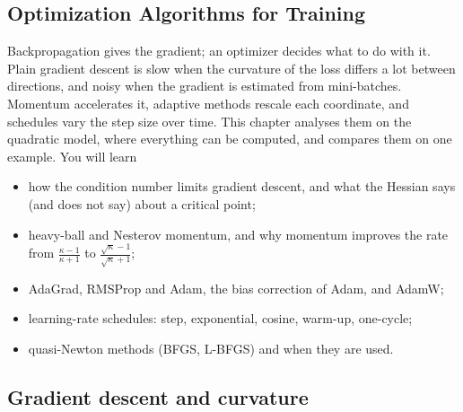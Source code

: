 \begin{notechapter}
\chapter{Optimization Algorithms for Training}\label{ch:optimizers}

\begin{chapterintro}
Backpropagation gives the gradient; an optimizer decides what to do with it. Plain gradient
descent is slow when the curvature of the loss differs a lot between directions, and noisy
when the gradient is estimated from mini-batches. Momentum accelerates it, adaptive methods
rescale each coordinate, and schedules vary the step size over time. This chapter analyses
them on the quadratic model, where everything can be computed, and compares them on one
example. You will learn
\begin{itemize}[nosep]
  \item how the condition number limits gradient descent, and what the Hessian says (and
        does not say) about a critical point;
  \item heavy-ball and Nesterov momentum, and why momentum improves the rate from
        $\frac{\kappa - 1}{\kappa + 1}$ to $\frac{\sqrt\kappa - 1}{\sqrt\kappa + 1}$;
  \item AdaGrad, RMSProp and Adam, the bias correction of Adam, and AdamW;
  \item learning-rate schedules: step, exponential, cosine, warm-up, one-cycle;
  \item quasi-Newton methods (BFGS, L-BFGS) and when they are used.
\end{itemize}
\end{chapterintro}

\section{Gradient descent and curvature}\label{optimizers:sec:gd}


\end{notechapter}
